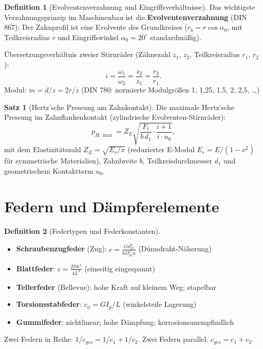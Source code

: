 ﻿\documentclass[a4paper,12pt]{report}
\theoremstyle{definition}
\newtheorem{definition}{Definition}
\newtheorem{satz}{Satz}
\begin{document}
\begin{definition}[Evolventenverzahnung und Eingriffsverhältnisse]
Das wichtigste Verzahnungsprinzip im Maschinenbau ist die
\textbf{Evolventenverzahnung} (DIN 867): Der Zahnprofil ist eine Evolvente
des Grundkreises ($r_b = r\cos\alpha_0$, mit Teilkreisradius $r$ und
Eingriffswinkel $\alpha_0 = 20^\circ$ standardm\"a\ss{}ig).

\"Ubersetzungsverh\"altnis zweier Stirnr\"ader (Z\"ahnezahl $z_1$, $z_2$,
Teilkreisradius $r_1$, $r_2$):
\[
  i = \frac{\omega_1}{\omega_2} = \frac{z_2}{z_1} = \frac{r_2}{r_1}.
\]
Modul: $m = d/z = 2r/z$ (DIN 780: normierte Modulgr\"o\ss{}en 1, 1{,}25, 1{,}5, 2, 2{,}5, \ldots)
\end{definition}

\begin{satz}[Hertz'sche Pressung am Zahnkontakt]
Die maximale Hertz'sche Pressung im Zahnflankenkontakt
(zylindrische Evolventen-Stirnr\"ader):
\[
  p_{H,\max} = Z_E\sqrt{\frac{F_t}{b\,d_1}\cdot\frac{i+1}{i\cdot u_0}},
\]
mit dem Elastizit\"atszahl $Z_E = \sqrt{E_r/\pi}$ (reduzierter E-Modul
$E_r = E/(1-\nu^2)$ f\"ur symmetrische Materialien), Zahnbreite $b$,
Teilkreisdurchmesser $d_1$ und geometrischem Kontaktterm $u_0$.
\end{satz}

\section{Federn und D\"ampferelemente}

\begin{definition}[Federtypen und Federkonstanten]
\begin{itemize}
    \item[-] \textbf{Schraubenzugfeder} (Zug): $c = \frac{G d_D^4}{8 D_m^3 n}$ (D\"unndraht-N\"aherung)
    \item[-] \textbf{Blattfeder}: $c = \frac{E b h^3}{4L^3}$ (einseitig eingespannt)
    \item[-] \textbf{Tellerfeder} (Bellevue): hohe Kraft auf kleinem Weg; stapelbar
    \item[-] \textbf{Torsionsstabfeder}: $c_\phi = GI_p/L$ (winkelsteife Lagerung)
    \item[-] \textbf{Gummifeder}: nichtlinear; hohe D\"ampfung; korrosionsunempfindlich
\end{itemize}
Zwei Federn in Reihe: $1/c_{ges} = 1/c_1 + 1/c_2$.
Zwei Federn parallel: $c_{ges} = c_1 + c_2$.
\end{definition}
\end{document}
